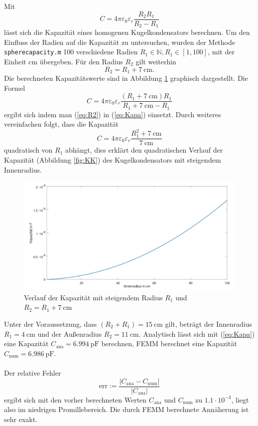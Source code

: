 Mit 
\begin{equation}
	C = 4\pi\varepsilon_0\varepsilon_r\frac{R_2R_1}{R_2-R_1}
	\label{eq:Kapa}	
\end{equation}
lässt sich die Kapazität eines homogenen Kugelkondensators berechnen.
Um den Einfluss der Radien auf die Kapazität zu untersuchen, wurden der Methode \texttt{spherecapacity.m} 100 verschiedene Radien $R_1 \in \mathbb{N}, R_1 \in [1,100]$, mit der Einheit \si{\centi\meter} übergeben. Für den Radius $R_2$ gilt weiterhin
\begin{equation}
	R_2 = R_1 + \SI{7}{\centi\meter}.
	\label{eq:R2}
\end{equation}
Die berechneten Kapazitätswerte sind in Abbildung \ref{fig:Kapa} graphisch dargestellt. Die Formel 
\begin{equation}
	C = 4\pi\varepsilon_0\varepsilon_r\frac{(R_1+\SI{7}{\centi\meter})R_1}{R_1+\SI{7}{\centi\meter-R_1}}
\end{equation}
ergibt sich indem man (\ref{eq:R2}) in (\ref{eq:Kapa}) einsetzt. Durch weiteres vereinfachen folgt, dass die Kapazität
\begin{equation}
	C = 4\pi\varepsilon_0\varepsilon_r\frac{R_1^2+\SI{7}{\centi\meter}}{\SI{7}{\centi\meter}}
\end{equation}
quadratisch von $R_1$ abhängt, dies erklärt den quadratischen Verlauf der Kapazität (Abbildung \ref{fig:KK}) des Kugelkondensators mit steigendem Innenradius.

\begin{figure}
	\centering
	\includegraphics[width=\textwidth]{data/Kugelkapa}
	\caption{Verlauf der Kapazität mit steigendem Radius $R_1$ und $R_2 = R_1 + \SI{7}{\centi\meter}$}
	\label{fig:Kapa}
\end{figure}
\newpage
Unter der Voraussetzung, dass $(R_2+R_1) = \SI{15}{\centi\meter}$ gilt, beträgt der Innenradius $R_1 = \SI{4}{\centi\meter}$ und der Außenradius $R_2 = \SI{11}{\centi\meter}$. Analytisch lässt sich mit (\ref{eq:Kapa}) eine Kapazität $C_{\mathrm{ana}} = \SI{6,994}{\pico\farad}$ berechnen, FEMM berechnet eine Kapazität $C_{\mathrm{num}} = \SI{6,986}{\pico\farad}$. \\ \\
Der relative Fehler
\begin{equation}
	\mathrm{err :=} \frac{|C_{\mathrm{ana}}-C_{\mathrm{num}}|}{|C_{\mathrm{ana}}|}
	\label{eq:err}
\end{equation}
ergibt sich mit den vorher berechneten Werten $C_{\mathrm{ana}}$ und $C_{\mathrm{num}}$ zu $1.1 \cdot 10^{-3}$, liegt also im niedrigen Promillebereich. Die durch FEMM berechnete Annäherung ist sehr exakt.